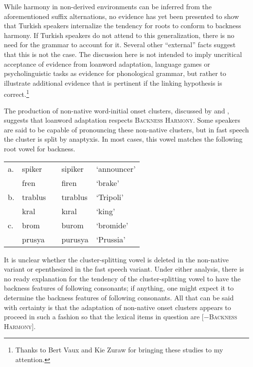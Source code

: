 While harmony in non-derived environments can be inferred from the aforementioned suffix alternations, no evidence has yet been presented to show that Turkish speakers internalize the tendency for roots to conform to backness harmony. If Turkish speakers do not attend to this generalization, there is no need for the grammar to account for it. Several other ``external'' facts suggest that this is not the case. The discussion here is not intended to imply uncritical acceptance of evidence from loanword adaptation, language games or psycholinguistic tasks as evidence for phonological grammar, but rather to illustrate additional evidence that is pertinent if the linking hypothesis is correct.\footnote{Thanks to Bert Vaux and Kie Zuraw for bringing these studies to my attention.}

The production of non-native word-initial onset clusters, discussed by \citet{Clements1982} and \citet{Kaun1999}, suggests that loanword adaptation respects \textsc{Backness Harmony}. Some speakers are said to be capable of pronouncing these non-native clusters, but in fast speech the cluster is split by anaptyxis. In most cases, this vowel matches the following root vowel for backness.

\begin{example} 
\begin{tabular}{lllll}
a. & {spiker}  & \alt{} & {sipiker}  & `announcer' \\
   & {fren}    & \alt{} & {firen}    & `brake'     \\
b. & {trablus} & \alt{} & {tırablus} & `Tripoli'   \\
   & {kral}    & \alt{} & {kıral}    & `king'      \\
c. & {brom}    & \alt{} & {burom}    & `bromide'   \\
   & {prusya}  & \alt{} & {purusya}  & `Prussia'   \\
\end{tabular}
\label{spiker}
\end{example}

\noindent
It is unclear whether the cluster-splitting vowel is deleted in the non-native variant or epenthesized in the fast speech variant. Under either analysis, there is no ready explanation for the tendency of the cluster-splitting vowel to have the backness features of following consonants; if anything, one might expect it to determine the backness features of following consonants. All that can be said with certainty is that the adaptation of non-native onset clusters appears to proceed in such a fashion so that the lexical items in question are [$-$\textsc{Backness Harmony}].

